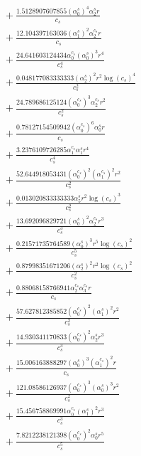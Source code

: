 \documentclass[10pt]{article}
\begin{document}
\begin{align*}
&{}  + \frac{1.5128907607855 \left(\alpha_{0}^s\right)^{4} \alpha_{2}^s r}{c_{s}} \\
&{}  + \frac{12.104397163036 \left(\alpha_{1}^s\right)^{2} \alpha_{2}^{c_s} r}{c_{s}} \\
&{}  + \frac{24.641603124434 \alpha_{0}^{c_s} \left(\alpha_{0}^s\right)^{3} r^{4}}{c_{s}^{4}} \\
&{}  + \frac{0.048177083333333 \left(\alpha_{2}^s\right)^{2} r^{2} \log{\left(c_{s} \right)}^{4}}{c_{s}^{2}} \\
&{}  + \frac{24.789686125124 \left(\alpha_{0}^{c_s}\right)^{3} \alpha_{2}^{c_s} r^{2}}{c_{s}^{2}} \\
&{}  + \frac{0.78127154509942 \left(\alpha_{0}^{c_s}\right)^{6} \alpha_{0}^s r}{c_{s}} \\
&{}  + \frac{3.2376109726285 \alpha_{1}^{c_s} \alpha_{1}^s r^{4}}{c_{s}^{4}} \\
&{}  + \frac{52.644918053431 \left(\alpha_{0}^{c_s}\right)^{2} \left(\alpha_{1}^{c_s}\right)^{2} r^{2}}{c_{s}^{2}} \\
&{}  + \frac{0.013020833333333 \alpha_{5}^s r^{2} \log{\left(c_{s} \right)}^{3}}{c_{s}^{2}} \\
&{}  + \frac{13.692096829721 \left(\alpha_{0}^s\right)^{2} \alpha_{2}^{c_s} r^{3}}{c_{s}^{3}} \\
&{}  + \frac{0.21571735764589 \left(\alpha_{0}^s\right)^{3} r^{5} \log{\left(c_{s} \right)}^{2}}{c_{s}^{5}} \\
&{}  + \frac{0.87998351671206 \left(\alpha_{2}^s\right)^{2} r^{2} \log{\left(c_{s} \right)}^{2}}{c_{s}^{2}} \\
&{}  + \frac{0.88068158766941 \alpha_{2}^{c_s} \alpha_{3}^{c_s} r}{c_{s}} \\
&{}  + \frac{57.627812385852 \left(\alpha_{0}^{c_s}\right)^{2} \left(\alpha_{1}^s\right)^{2} r^{2}}{c_{s}^{2}} \\
&{}  + \frac{14.930341170833 \left(\alpha_{0}^{c_s}\right)^{2} \alpha_{2}^s r^{3}}{c_{s}^{3}} \\
&{}  + \frac{15.006163888297 \left(\alpha_{0}^s\right)^{3} \left(\alpha_{1}^{c_s}\right)^{2} r}{c_{s}} \\
&{}  + \frac{121.08586126937 \left(\alpha_{0}^{c_s}\right)^{3} \left(\alpha_{0}^s\right)^{3} r^{2}}{c_{s}^{2}} \\
&{}  + \frac{15.456758869991 \alpha_{0}^{c_s} \left(\alpha_{1}^s\right)^{2} r^{3}}{c_{s}^{3}} \\
&{}  + \frac{7.8212238121398 \left(\alpha_{0}^{c_s}\right)^{2} \alpha_{0}^s r^{5}}{c_{s}^{5}} \\

\end{align*}
\end{document}
